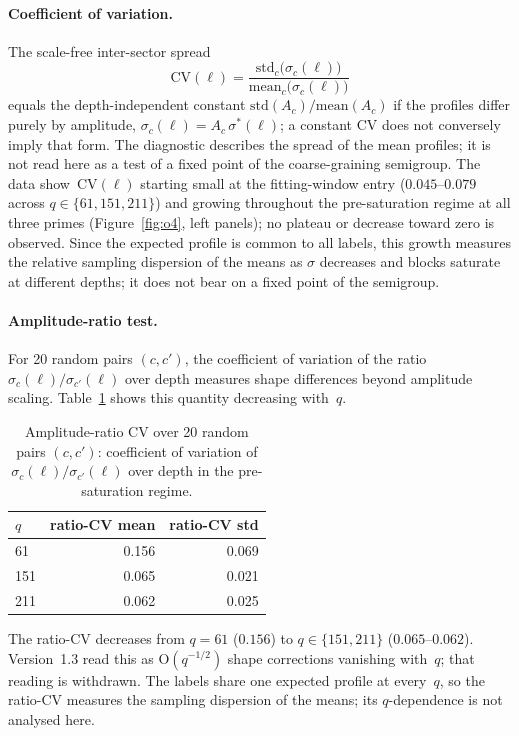 \documentclass[11pt,a4paper]{article}
\theoremstyle{plain}
\theoremstyle{definition}
\theoremstyle{remark}
\begin{document}
  \paragraph{Coefficient of variation.}
    The scale-free inter-sector spread
    \begin{equation}
      \label{eq:cv}
      \mathrm{CV}(\ell)
      = \frac{\mathrm{std}_c\bigl(\sigma_c(\ell)\bigr)}
      {\mathrm{mean}_c\bigl(\sigma_c(\ell)\bigr)}
    \end{equation}
    equals the depth-independent constant $\mathrm{std}(A_c)/\mathrm{mean}(A_c)$ if the profiles
    differ purely by amplitude, $\sigma_c(\ell) = A_c\,\sigma^*(\ell)$; a constant CV does not
    conversely imply that form.
    The diagnostic describes the spread of the mean profiles; it is not read here as a test of a
    fixed point of the coarse-graining semigroup.
    The data show~$\mathrm{CV}(\ell)$ starting small at the fitting-window entry
    ($0.045$--$0.079$ across $q \in \{61, 151, 211\}$)
    and growing throughout the pre-saturation regime at all three primes
    (Figure~\ref{fig:o4}, left panels);
    no plateau or decrease toward zero is observed.
    Since the expected profile is common to all labels, this growth measures the relative
    sampling dispersion of the means as $\sigma$ decreases and blocks saturate at different
    depths; it does not bear on a fixed point of the semigroup.

  \paragraph{Amplitude-ratio test.}
    For 20 random pairs $(c, c')$, the coefficient of variation of the ratio
    $\sigma_c(\ell)/\sigma_{c'}(\ell)$ over depth measures shape differences
    beyond amplitude scaling.
    Table~\ref{tab:o4} shows this quantity decreasing with~$q$.
    \begin{table}[h]
      \centering
      \begin{tabular}{lrr}
        \toprule
        $q$ & ratio-CV mean & ratio-CV std \\
        \midrule
        61  & 0.156 & 0.069 \\
        151 & 0.065 & 0.021 \\
        211 & 0.062 & 0.025 \\
        \bottomrule
      \end{tabular}
      \caption{Amplitude-ratio CV over 20 random pairs $(c, c')$:
      coefficient of variation of $\sigma_c(\ell)/\sigma_{c'}(\ell)$
        over depth in the pre-saturation regime.}
      \label{tab:o4}
    \end{table}
    The ratio-CV decreases from $q = 61$ ($0.156$) to $q \in \{151, 211\}$ ($0.065$--$0.062$).
    Version~1.3 read this as $\mathrm{O}(q^{-1/2})$ shape corrections vanishing with~$q$; that
    reading is withdrawn.
    The labels share one expected profile at every~$q$, so the ratio-CV measures the sampling
    dispersion of the means; its $q$-dependence is not analysed here.
\end{document}
